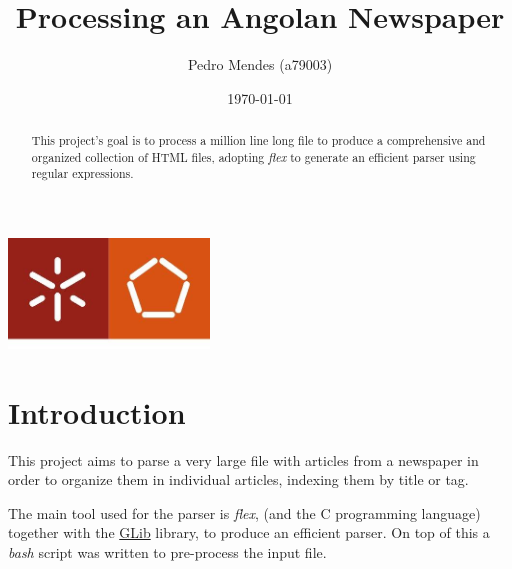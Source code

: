 \documentclass[a4paper]{report}
\begin{document}
\title{Processing an Angolan Newspaper}
\author{Pedro Mendes (a79003)}
\date{\today}

\begin{center}
    \begin{minipage}{0.75\linewidth}
        \centering
        \includegraphics[width=0.4\textwidth]{eng.jpeg}\par\vspace{1cm}
        \vspace{1.5cm}
        \href{https://www.uminho.pt/PT}
        {\color{black}{\scshape\LARGE Universidade do Minho}} \par
        \vspace{1cm}
        \href{https://www.di.uminho.pt/}
        {\color{black}{\scshape\Large Departamento de Informática}} \par
        \vspace{1.5cm}
        \maketitle
    \end{minipage}
\end{center}

\begin{abstract}
    \begin{center}
        This project's goal is to process a million line long file to produce a
        comprehensive and organized collection of HTML files, adopting
        \textit{flex} to generate an efficient parser using regular expressions.
    \end{center}
\end{abstract}

\tableofcontents

\pagebreak

\chapter{Introduction}
This project aims to parse a very large file with articles from a newspaper in
order to organize them in individual articles, indexing them by title or tag.

The main tool used for the parser is \textit{flex}, (and the C programming
language) together with the \href{https://developer.gnome.org/}{GLib} library,
to produce an efficient parser. On top of this a \textit{bash} script was
written to pre-process the input file.
\end{document}
